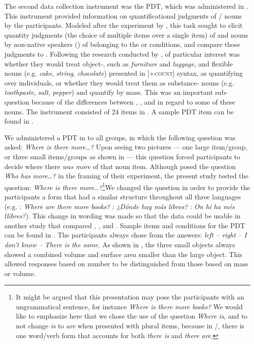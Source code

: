 \documentclass[output=paper]{langsci/langscibook}
\begin{document}
The second data collection instrument was the PDT, which was administered in . This instrument provided information on quantificational judgments of / nouns by the participants. Modeled after the experiment by \citet{BarnerSnedeker2005}, this task sought to elicit quantity judgments (the choice of multiple items over a single item) of  and  nouns by non-native speakers () of  belonging to the  or  conditions, and compare those judgments to  . Following the research conducted by \citet{BarnerSnedeker2005}, of particular interest was whether they would treat object-, such as \textit{furniture} and \textit{luggage}, and flexible nouns (e.g. \textit{cake}, \textit{string}, \textit{chocolate}) presented in [\textsc{+count}] syntax, as quantifying over individuals, or whether they would treat them as substance- nouns (e.g. \textit{toothpaste}, \textit{salt}, \textit{pepper}) and quantify by mass. This was an important sub-question because of the differences between , , and  in regard to some of these nouns. The instrument consisted of 24 items in . A sample PDT item can be found in .




\largerpage[2]
We administered a PDT in  to all groups, in which the following question was asked: \textit{Where is there more…?} Upon seeing two pictures — one large item/group, or three small items/groups as shown in   — this question forced participants to decide where there \textit{was more} of that noun item. Although \citet{BarnerSnedeker2005} posed the question \textit{Who has more…?} in the framing of their experiment, the present study tested the question: \textit{Where is there more…?}\footnote{It might be argued that this presentation may pose the participants with an ungrammatical sentence, for instance \textit{Where is there more books?} We would like to emphasize here that we chose the use of the question \textit{Where is}, and to not change \textit{is} to \textit{are} when presented with plural items, because in /, there is one word/verb form that accounts for both \textit{there is} and \textit{there are}.}\clearpage\noindent  We changed the question in order to provide the participants a  form that had a similar structure throughout all three languages (e.g. : \textit{Where are there more books?} : \textit{¿Dónde hay más libros?} : \textit{On hi ha més llibres?}). This change in wording was made so that the data could be usable in another study that compared , , and . Sample items and conditions for the PDT can be found in . The participants always chose from the answers: \textit{left – right – I don’t know – There is the same.} As shown in , the three small objects always showed a combined volume and surface area smaller than the large object.  This allowed responses based on number to be distinguished from those based on mass or volume. 
\end{document}
